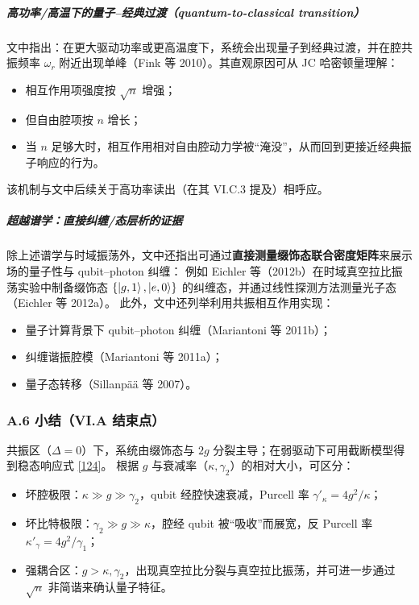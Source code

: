 \documentclass[12pt,a4paper,oneside]{ctexbook}
\let\oldsubparagraph\subparagraph
\renewcommand{\subparagraph}[1]{\oldsubparagraph{#1}\mbox{}}
\begin{document}
\subparagraph{高功率/高温下的量子--经典过渡（quantum-to-classical transition）}
文中指出：在更大驱动功率或更高温度下，系统会出现量子到经典过渡，并在腔共振频率 $\omega_r$ 附近出现单峰（Fink 等 2010）。其直观原因可从 JC 哈密顿量理解：
\begin{itemize}
\item 相互作用项强度按 $\sqrt{n}$ 增强；
\item 但自由腔项按 $n$ 增长；
\item 当 $n$ 足够大时，相互作用相对自由腔动力学被“淹没”，从而回到更接近经典振子响应的行为。
\end{itemize}
该机制与文中后续关于高功率读出（在其 VI.C.3 提及）相呼应。

\subparagraph{超越谱学：直接纠缠/态层析的证据}
除上述谱学与时域振荡外，文中还指出可通过\textbf{直接测量缀饰态联合密度矩阵}来展示场的量子性与 qubit--photon 纠缠：
例如 Eichler 等（2012b）在时域真空拉比振荡实验中制备缀饰态 $\{\ket{g,1},\ket{e,0}\}$ 的纠缠态，并通过线性探测方法测量光子态（Eichler 等 2012a）。
此外，文中还列举利用共振相互作用实现：
\begin{itemize}
\item 量子计算背景下 qubit--photon 纠缠（Mariantoni 等 2011b）；
\item 纠缠谐振腔模（Mariantoni 等 2011a）；
\item 量子态转移（Sillanp{\"a}{\"a} 等 2007）。
\end{itemize}

\subsubsection{A.6 小结（VI.A 结束点）}
共振区（$\Delta=0$）下，系统由缀饰态与 $2g$ 分裂主导；在弱驱动下可用截断模型得到稳态响应式 \eqref{124}。
根据 $g$ 与衰减率（$\kappa,\gamma_2$）的相对大小，可区分：
\begin{itemize}
\item 坏腔极限：$\kappa\gg g\gg \gamma_2$，qubit 经腔快速衰减，Purcell 率 $\gamma'_\kappa=4g^2/\kappa$；
\item 坏比特极限：$\gamma_2\gg g\gg \kappa$，腔经 qubit 被“吸收”而展宽，反 Purcell 率 $\kappa'_\gamma=4g^2/\gamma_1$；
\item 强耦合区：$g>\kappa,\gamma_2$，出现真空拉比分裂与真空拉比振荡，并可进一步通过 $\sqrt{n}$ 非简谐来确认量子特征。
\end{itemize}


\end{document}
